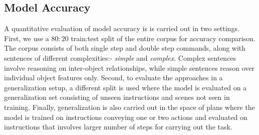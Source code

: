 \subsection{Model Accuracy}
A quantitative evaluation of model accuracy is is carried out in two settings. First, we use a $80:20$ train:test split of the entire corpus for accuracy comparison. The corpus consists of both single step and double step commands, along with sentences of different complexities:- \textit{simple} and \textit{complex}. Complex sentences involve reasoning on inter-object relationships, while simple sentences reason over individual object features only. Second, to evaluate the approaches in a generalization setup, a different split is used where the model is evaluated on a generalization set consisting of unseen instructions and scenes not seen in training. Finally, generalization is also carried out in the space of plans where the model is trained on instructions conveying one or two actions and evaluated on instructions that involves larger number of steps for carrying out the task. 

